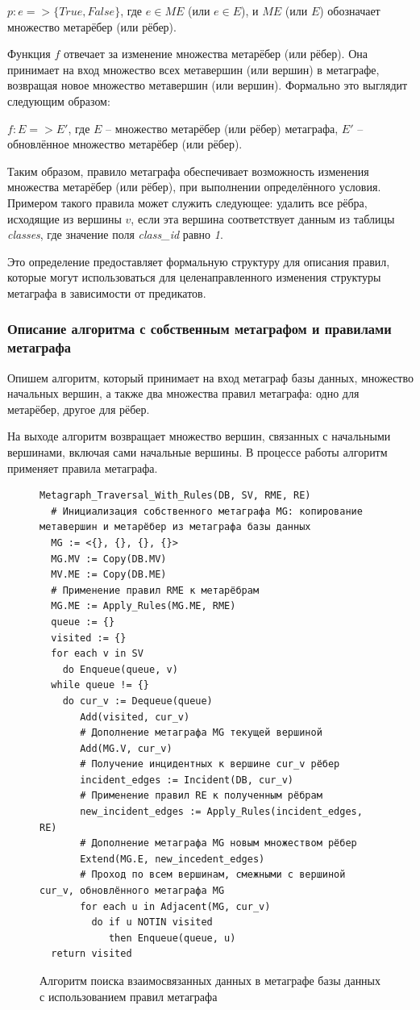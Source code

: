 $p: e => \{True, False\}$, где $e \in ME$ (или $e \in E$), и $ME$ (или $E$) обозначает множество метарёбер (или рёбер).

Функция $f$ отвечает за изменение множества метарёбер (или рёбер). Она принимает на вход множество всех метавершин (или вершин) в метаграфе, возвращая новое множество метавершин (или вершин). Формально это выглядит следующим образом:

$f: E => E'$, где $E$ -- множество метарёбер (или рёбер) метаграфа, $E'$ -- обновлённое множество метарёбер (или рёбер).

Таким образом, правило метаграфа обеспечивает возможность изменения множества метарёбер (или рёбер), при выполнении определённого условия. Примером такого правила может служить следующее: удалить все рёбра, исходящие из вершины $v$, если эта вершина соответствует данным из таблицы \textit{classes}, где значение поля \textit{class\_id} равно \textit{1}.

Это определение предоставляет формальную структуру для описания правил, которые могут использоваться для целенаправленного изменения структуры метаграфа в зависимости от предикатов.

\subsubsection{Описание алгоритма с собственным метаграфом и правилами метаграфа}
Опишем алгоритм, который принимает на вход метаграф базы данных, множество начальных вершин, а также два множества правил метаграфа: одно для метарёбер, другое для рёбер.

На выходе алгоритм возвращает множество вершин, связанных с начальными вершинами, включая сами начальные вершины. В процессе работы алгоритм применяет правила метаграфа.

\begin{figure}
  \begin{lstlisting}
Metagraph_Traversal_With_Rules(DB, SV, RME, RE)
  # Инициализация собственного метаграфа MG: копирование метавершин и метарёбер из метаграфа базы данных
  MG := <{}, {}, {}, {}>
  MG.MV := Copy(DB.MV)
  MV.ME := Copy(DB.ME)
  # Применение правил RME к метарёбрам
  MG.ME := Apply_Rules(MG.ME, RME)
  queue := {}
  visited := {}
  for each v in SV
    do Enqueue(queue, v)
  while queue != {}
    do cur_v := Dequeue(queue)
       Add(visited, cur_v)
       # Дополнение метаграфа MG текущей вершиной
       Add(MG.V, cur_v)
       # Получение инцидентных к вершине cur_v рёбер
       incident_edges := Incident(DB, cur_v)
       # Применение правил RE к полученным рёбрам
       new_incident_edges := Apply_Rules(incident_edges, RE)
       # Дополнение метаграфа MG новым множеством рёбер
       Extend(MG.E, new_incedent_edges)
       # Проход по всем вершинам, смежными с вершиной cur_v, обновлённого метаграфа MG
       for each u in Adjacent(MG, cur_v)
         do if u NOTIN visited
            then Enqueue(queue, u)
  return visited
  \end{lstlisting}
  \caption{Алгоритм поиска взаимосвязанных данных в метаграфе базы данных с использованием правил метаграфа}
  \label{algorithm-with-rules}
\end{figure}

